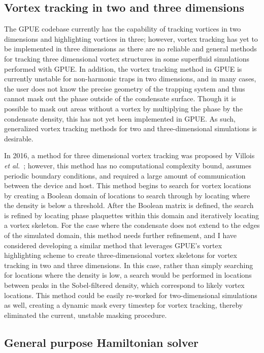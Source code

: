 \subsection{Vortex tracking in two and three dimensions}

The GPUE codebase currently has the capability of tracking vortices in two dimensions and highlighting vortices in three; however, vortex tracking has yet to be implemented in three dimensions as there are no reliable and general methods for tracking three dimensional vortex structures in some superfluid simulations performed with GPUE.
In addition, the vortex tracking method in GPUE is currently unstable for non-harmonic traps in two dimensions, and in many cases, the user does not know the precise geometry of the trapping system and thus cannot mask out the phase outside of the condensate surface.
Though it is possible to mask out areas without a vortex by multiplying the phase by the condensate density, this has not yet been implemented in GPUE.
As such, generalized vortex tracking methods for two and three-dimensional simulations is desirable.

In 2016, a method for three dimensional vortex tracking was proposed by Villois \textit{et al.}~\cite{villois2016}; however, this method has no computational complexity bound, assumes periodic boundary conditions, and required a large amount of communication between the device and host.
This method begins to search for vortex locations by creating a Boolean domain of locations to search through by locating where the density is below a threshold.
After the Boolean matrix is defined, the search is refined by locating phase plaquettes within this domain and iteratively locating a vortex skeleton.
For the case where the condensate does not extend to the edges of the simulated domain, this method needs further refinement, and
I have considered developing a similar method that leverages GPUE's vortex highlighting scheme to create three-dimensional vortex skeletons for vortex tracking in two and three dimensions.
In this case, rather than simply searching for locations where the density is low, a search would be performed in locations between peaks in the Sobel-filtered density, which correspond to likely vortex locations.
This method could be easily re-worked for two-dimensional simulations as well, creating a dynamic mask every timestep for vortex tracking, thereby eliminated the current, unstable masking procedure.

\subsection{General purpose Hamiltonian solver}

